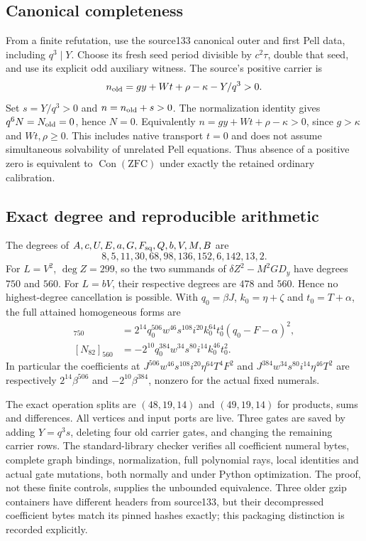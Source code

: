 \documentclass[11pt]{article}
\begin{document}
\subsection{Canonical completeness}
From a finite refutation, use the source133 canonical outer and first
Pell data, including $q^3\mid Y$. Choose its fresh seed period divisible
by $c^2\tau$, double that seed, and use its explicit odd auxiliary
witness. The source's positive carrier is
\[
 n_{\rm old}=gy+Wt+\rho-\kappa-Y/q^3>0.
\]
Set $s=Y/q^3>0$ and $n=n_{\rm old}+s>0$.
The normalization identity gives $q^6N=N_{\rm old}=0$, hence $N=0$.
Equivalently $n=gy+Wt+\rho-\kappa>0$, since $g>\kappa$ and
$Wt,\rho\ge0$. This includes native transport $t=0$ and does not
assume simultaneous solvability of unrelated Pell equations.
Thus absence of a positive zero is equivalent to $\operatorname{Con}
(\mathrm{ZFC})$ under exactly the retained ordinary calibration.

\subsection{Exact degree and reproducible arithmetic}
The degrees of $A,c,U,E,a,G,F_{\rm sq},Q,b,V,M,B$ are
\[
 8,5,11,30,68,98,136,152,6,142,13,2.
\]
For $L=V^2$, $\deg Z=299$, so the two summands of
$\delta Z^2-M^2GD_y$ have degrees $750$ and $560$. For $L=bV$, their
respective degrees are $478$ and $560$. Hence no highest-degree cancellation
is possible.
With $q_0=\beta J$, $k_0=\eta+\zeta$ and $t_0=T+\alpha$, the full
attained homogeneous forms are
\begin{align*}
 [N_{81}]_{750}&=2^{14}q_0^{506}w^{46}s^{108}i^{20}k_0^{64}
 t_0^4(q_0-F-\alpha)^2,\\
 [N_{82}]_{560}&=-2^{10}q_0^{384}w^{34}s^{80}i^{14}k_0^{46}t_0^2.
\end{align*}
In particular the coefficients at
$J^{506}w^{46}s^{108}i^{20}\eta^{64}T^4F^2$ and
$J^{384}w^{34}s^{80}i^{14}\eta^{46}T^2$ are respectively
$2^{14}\beta^{506}$ and $-2^{10}\beta^{384}$, nonzero for the actual
fixed numerals.

The exact operation splits are $(48,19,14)$ and $(49,19,14)$ for products,
sums and differences. All vertices and input ports are live. Three gates
are saved by adding $Y=q^3s$, deleting four old carrier gates, and changing
the remaining carrier rows. The standard-library checker verifies all
coefficient numeral bytes, complete graph bindings, normalization,
full polynomial rays, local identities and actual gate mutations, both
normally and under Python optimization. The proof, not these finite
controls, supplies the unbounded equivalence. Three older gzip containers
have different headers from source133, but their decompressed coefficient
bytes match its pinned hashes exactly; this packaging distinction is
recorded explicitly.
\end{document}
